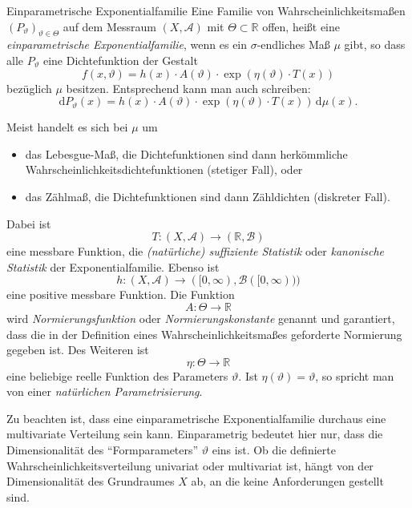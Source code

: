 \begin{defi}{Einparametrische Exponentialfamilie}
    Eine Familie von Wahrscheinlichkeitsmaßen $(P_{\vartheta})_{\vartheta \in \Theta}$ auf dem Messraum $(X, \mathcal{A})$ mit $\Theta \subset \mathbb{R}$ offen, heißt eine \emph{einparametrische Exponentialfamilie}, wenn es ein $\sigma$-endliches Maß $\mu$ gibt, so dass alle $P_{\vartheta}$ eine Dichtefunktion der Gestalt
    \[
        f(x, \vartheta) = h(x) \cdot A(\vartheta) \cdot \exp \left( \eta(\vartheta) \cdot T(x) \right)
    \]
    bezüglich $\mu$ besitzen.
    Entsprechend kann man auch schreiben:
    \[
        \mathrm{d} P_{\vartheta}(x) = h(x) \cdot A(\vartheta) \cdot \exp \left( \eta(\vartheta) \cdot T(x) \right) \, \mathrm{d} \mu(x).
    \]

    Meist handelt es sich bei $\mu$ um
    \begin{itemize}
        \item das Lebesgue-Maß, die Dichtefunktionen sind dann herkömmliche Wahrscheinlichkeitsdichtefunktionen (stetiger Fall), oder
        \item das Zählmaß, die Dichtefunktionen sind dann Zähldichten (diskreter Fall).
    \end{itemize}

    Dabei ist
    \[
        T: (X, \mathcal{A}) \to (\mathbb{R}, \mathcal{B})
    \]
    eine messbare Funktion, die \emph{(natürliche) suffiziente Statistik} oder \emph{kanonische Statistik} der Exponentialfamilie.
    Ebenso ist
    \[
        h: (X, \mathcal{A}) \to ([0, \infty), \mathcal{B}([0, \infty)))
    \]
    eine positive messbare Funktion.
    Die Funktion
    \[
        A: \Theta \to \mathbb{R}
    \]
    wird \emph{Normierungsfunktion} oder \emph{Normierungskonstante} genannt und garantiert, dass die in der Definition eines Wahrscheinlichkeitsmaßes geforderte Normierung gegeben ist.
    Des Weiteren ist
    \[
        \eta: \Theta \to \mathbb{R}
    \]
    eine beliebige reelle Funktion des Parameters $\vartheta$.
    Ist $\eta(\vartheta) = \vartheta$, so spricht man von einer \emph{natürlichen Parametrisierung}.

    Zu beachten ist, dass eine einparametrische Exponentialfamilie durchaus eine multivariate Verteilung sein kann.
    Einparametrig bedeutet hier nur, dass die Dimensionalität des \enquote{Formparameters} $\vartheta$ eins ist.
    Ob die definierte Wahrscheinlichkeitsverteilung univariat oder multivariat ist, hängt von der Dimensionalität des Grundraumes $X$ ab, an die keine Anforderungen gestellt sind.
\end{defi}

